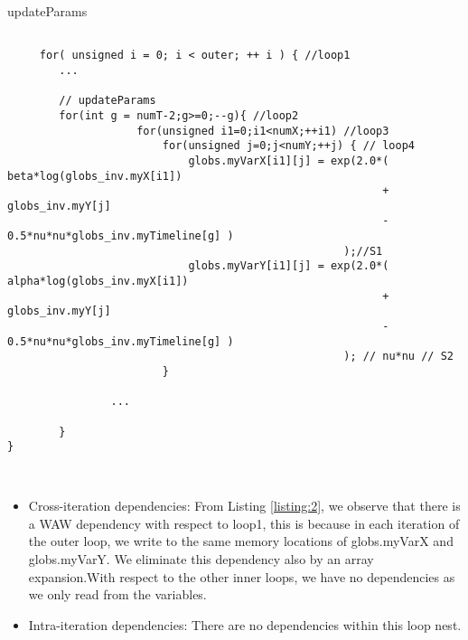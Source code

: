 \documentclass{article}
\begin{document}
\begin{listing}[H]
\caption{updateParams}
\begin{verbatim}
    
     for( unsigned i = 0; i < outer; ++ i ) { //loop1
        ...
    
        // updateParams
        for(int g = numT-2;g>=0;--g){ //loop2
                    for(unsigned i1=0;i1<numX;++i1) //loop3
                        for(unsigned j=0;j<numY;++j) { // loop4
                            globs.myVarX[i1][j] = exp(2.0*(  beta*log(globs_inv.myX[i1])   
                                                          + globs_inv.myY[j]             
                                                          - 0.5*nu*nu*globs_inv.myTimeline[g] )
                                                    );//S1
                            globs.myVarY[i1][j] = exp(2.0*(  alpha*log(globs_inv.myX[i1])   
                                                          + globs_inv.myY[j]             
                                                          - 0.5*nu*nu*globs_inv.myTimeline[g] )
                                                    ); // nu*nu // S2
                        }
                
                ...
                 
        }
}
     
 
\end{verbatim}
\label{listing:2}
\end{listing}

\begin{itemize}
     \item {Cross-iteration dependencies: From Listing \ref{listing:2}, we observe that there is a WAW dependency with respect to loop1, this is because in each iteration of the outer loop, we write to the same memory locations of globs.myVarX and globs.myVarY. We eliminate this dependency also by an array expansion.With respect to the other inner loops, we have no dependencies as we only read from the variables.  
    }
    \item {Intra-iteration dependencies: There are no dependencies within this loop nest.}
\end{itemize}
\end{document}
